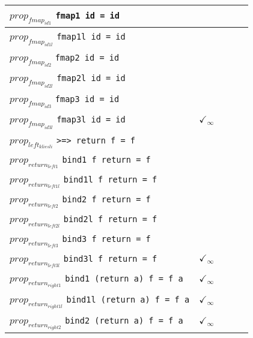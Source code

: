 \documentclass{article}
\begin{document}
\begin{longtable}{p{10cm} || c | c | c | c | }
\hline
$prop_{fmap_{id1}}$ \newline \verb`fmap1 id = id` &  &  &  &  \\
\hline
$prop_{fmap_{id1l}}$ \newline \verb`fmap1l id = id` &  &  &  &  \\
\hline
$prop_{fmap_{id2}}$ \newline \verb`fmap2 id = id` &  &  &  &  \\
\hline
$prop_{fmap_{id2l}}$ \newline \verb`fmap2l id = id` &  &  &  &  \\
\hline
$prop_{fmap_{id3}}$ \newline \verb`fmap3 id = id` &  &  &  &  \\
\hline
$prop_{fmap_{id3l}}$ \newline \verb`fmap3l id = id` & $\checkmark_{\infty}$ &  &  &  \\
\hline
$prop_{left_{kliesli}}$ \newline \verb`>=> return f = f` &  &  &  &  \\
\hline
$prop_{return_{left1}}$ \newline \verb`bind1 f return = f` &  &  &  &  \\
\hline
$prop_{return_{left1l}}$ \newline \verb`bind1l f return = f` &  &  &  &  \\
\hline
$prop_{return_{left2}}$ \newline \verb`bind2 f return = f` &  &  &  &  \\
\hline
$prop_{return_{left2l}}$ \newline \verb`bind2l f return = f` &  &  &  &  \\
\hline
$prop_{return_{left3}}$ \newline \verb`bind3 f return = f` &  &  &  &  \\
\hline
$prop_{return_{left3l}}$ \newline \verb`bind3l f return = f` & $\checkmark_{\infty}$ &  &  &  \\
\hline
$prop_{return_{right1}}$ \newline \verb`bind1 (return a) f = f a` & $\checkmark_{\infty}$ &  &  &  \\
\hline
$prop_{return_{right1l}}$ \newline \verb`bind1l (return a) f = f a` & $\checkmark_{\infty}$ &  &  &  \\
\hline
$prop_{return_{right2}}$ \newline \verb`bind2 (return a) f = f a` & $\checkmark_{\infty}$ &  &  &  \\

\end{longtable}
\end{document}
